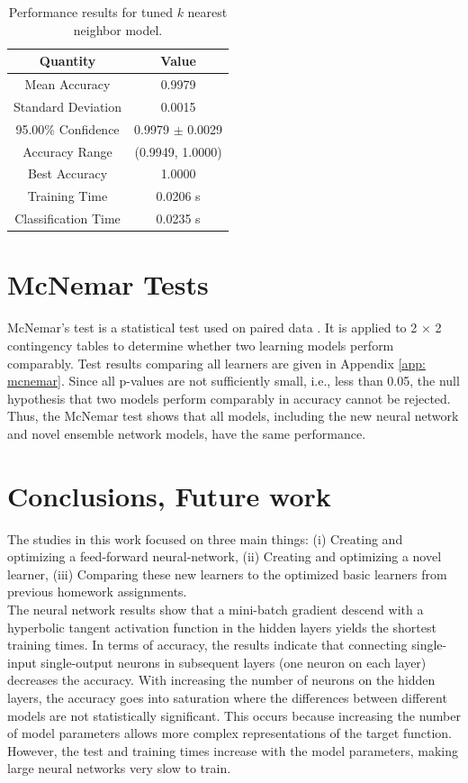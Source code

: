 \documentclass[paper=a4, fontsize=11pt]{scrartcl} %
\begin{document}
\begin{table}[H]
	\centering
	\caption{Performance results for tuned $k$ nearest neighbor model.}
	\begin{tabular}{|c|c|}
		\hline
		\textbf{Quantity}    & \textbf{Value}       \\ \hline \hline
		Mean Accuracy        & 0.9979 \\ \hline
		Standard Deviation   & 0.0015 \\ \hline
		95.00\% Confidence   & 0.9979 $\pm$ 0.0029 \\ \hline
		Accuracy Range       & (0.9949, 1.0000) \\ \hline
		Best Accuracy        & 1.0000 \\ \hline
		Training Time        & 0.0206 s\\ \hline
		Classification Time  & 0.0235 s \\ \hline
	\end{tabular}
	\label{tab: best knn}
\end{table}

\section{McNemar Tests} \label{sec: mcnemartests}

McNemar's test is a statistical test used on paired data \cite{Raschka}.
It is applied to 2 × 2 contingency tables to determine whether two learning models perform comparably.
Test results comparing all learners are given in Appendix \ref{app: mcnemar}. Since all p-values are not sufficiently small, i.e., less than 0.05, the null hypothesis that two models perform comparably in accuracy cannot be rejected. Thus, the McNemar test shows that all models, including the new neural network and novel ensemble network models, have the same performance.

\section{Conclusions, Future work} \label{sec: conclusion}
The studies in this work focused on three main things: (i) Creating and optimizing a feed-forward neural-network, (ii) Creating and optimizing a novel learner, (iii) Comparing these new learners to the optimized basic learners from previous homework assignments.
\\

The neural network results show that a mini-batch gradient descend with a hyperbolic tangent activation function in the hidden layers yields the shortest training times.
In terms of accuracy, the results indicate that connecting single-input single-output neurons in subsequent layers (one neuron on each layer) decreases the accuracy.
With increasing the number of neurons on the hidden layers, the accuracy goes into saturation where the differences between different models are not statistically significant. 
This occurs because increasing the number of model parameters allows more complex representations of the target function.
However, the test and training times increase with the model parameters, making large neural networks very slow to train.
\\
\end{document}
